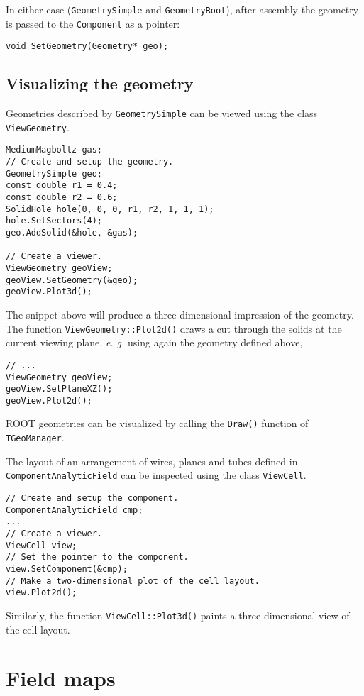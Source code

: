 In either case (\texttt{GeometrySimple} and \texttt{GeometryRoot}),
after assembly the geometry is passed to the \texttt{Component} as a pointer:
\begin{lstlisting}
void SetGeometry(Geometry* geo);
\end{lstlisting}

\subsection{Visualizing the geometry}

Geometries described by \texttt{GeometrySimple} can be viewed 
using the class \texttt{ViewGeometry}. 
\begin{lstlisting}
MediumMagboltz gas;
// Create and setup the geometry.
GeometrySimple geo;
const double r1 = 0.4;
const double r2 = 0.6;
SolidHole hole(0, 0, 0, r1, r2, 1, 1, 1);
hole.SetSectors(4);
geo.AddSolid(&hole, &gas);

// Create a viewer.
ViewGeometry geoView;
geoView.SetGeometry(&geo);
geoView.Plot3d();
\end{lstlisting}
The snippet above will produce a three-dimensional impression of the geometry.
The function \texttt{ViewGeometry::Plot2d()} draws a cut through the solids 
at the current viewing plane, \textit{e. g.} using again the geometry defined above,
\begin{lstlisting}
// ...
ViewGeometry geoView;
geoView.SetPlaneXZ();
geoView.Plot2d();
\end{lstlisting} 

ROOT geometries can be visualized by calling the \texttt{Draw()} function of
\texttt{TGeoManager}. 

The layout of an arrangement of wires, planes and tubes
defined in \texttt{ComponentAnalyticField} 
can be inspected using the class \texttt{ViewCell}.
\begin{lstlisting}
// Create and setup the component.
ComponentAnalyticField cmp;
... 
// Create a viewer.
ViewCell view;
// Set the pointer to the component.
view.SetComponent(&cmp);
// Make a two-dimensional plot of the cell layout.
view.Plot2d();
\end{lstlisting}
Similarly, the function \texttt{ViewCell::Plot3d()} paints
a three-dimensional view of the cell layout.

\section{Field maps}

